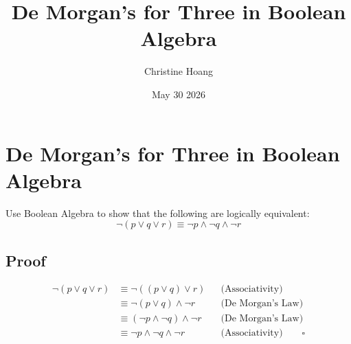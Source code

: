 \documentclass{article}
\title{De Morgan's for Three in Boolean Algebra}
\author{Christine Hoang}
\date{May 30 2026}
\begin{document}
\maketitle

\section{De Morgan's for Three in Boolean Algebra}

Use Boolean Algebra to show that the following are logically
equivalent:
\[
\neg(p \vee q \vee r) \equiv \neg p \wedge \neg q \wedge \neg r
\]

\subsection*{Proof}

\begin{align*}
\neg(p \vee q \vee r)
&\equiv \neg((p \vee q) \vee r) && \text{(Associativity)} \\
&\equiv \neg(p \vee q) \wedge \neg r && \text{(De Morgan's Law)} \\
&\equiv (\neg p \wedge \neg q) \wedge \neg r && \text{(De Morgan's Law)} \\
&\equiv \neg p \wedge \neg q \wedge \neg r && \text{(Associativity)} \qquad \square
\end{align*}
\end{document}
